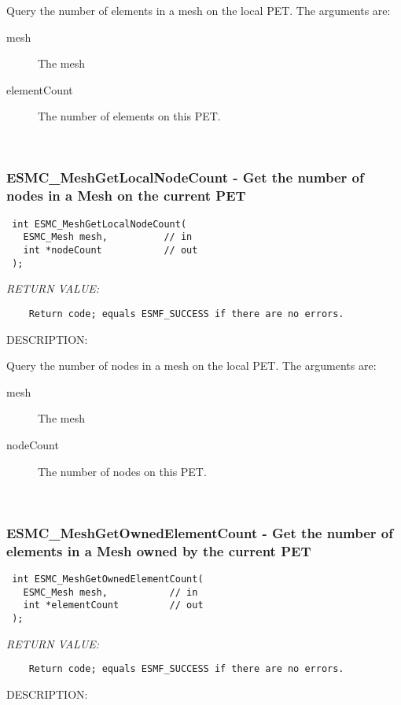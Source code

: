    Query the number of elements in a mesh on the local PET.
   The arguments are:
   \begin{description}
   \item[mesh]
       The mesh
   \item[elementCount]
       The number of elements on this PET.
   \end{description}
   
 
\mbox{}\hrulefill\ 
 
\subsubsection [ESMC\_MeshGetLocalNodeCount] {ESMC\_MeshGetLocalNodeCount - Get the number of nodes in a Mesh on the current PET}


  
\begin{verbatim} int ESMC_MeshGetLocalNodeCount(
   ESMC_Mesh mesh,          // in
   int *nodeCount           // out
 );
 \end{verbatim}{\em RETURN VALUE:}
\begin{verbatim}    Return code; equals ESMF_SUCCESS if there are no errors.\end{verbatim}
{\sf DESCRIPTION:\\ }


   Query the number of nodes in a mesh on the local PET.
   The arguments are:
   \begin{description}
   \item[mesh]
       The mesh
   \item[nodeCount]
       The number of nodes on this PET.
   \end{description}
   
 
\mbox{}\hrulefill\ 
 
\subsubsection [ESMC\_MeshGetOwnedElementCount] {ESMC\_MeshGetOwnedElementCount - Get the number of elements in a Mesh owned by the current PET}


  
\begin{verbatim} int ESMC_MeshGetOwnedElementCount(
   ESMC_Mesh mesh,           // in
   int *elementCount         // out
 );
 \end{verbatim}{\em RETURN VALUE:}
\begin{verbatim}    Return code; equals ESMF_SUCCESS if there are no errors.\end{verbatim}
{\sf DESCRIPTION:\\ }


